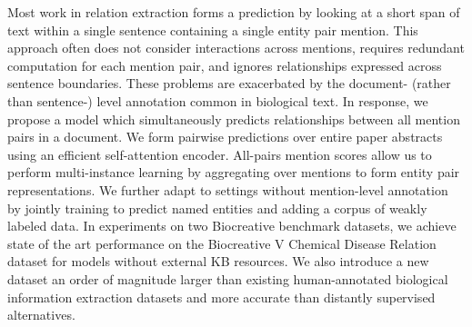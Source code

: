 Most work in relation extraction forms a prediction by looking at a short span of text within a single sentence containing a single entity pair mention. This approach often does not consider interactions across mentions, requires redundant computation for each mention pair, and ignores relationships expressed across sentence boundaries. These problems are exacerbated by the document- (rather than sentence-) level annotation common in biological text. In response, we propose a model which simultaneously predicts relationships between all mention pairs in a document. We form pairwise predictions over entire paper abstracts using an efficient self-attention encoder. All-pairs mention scores allow us to perform multi-instance learning by aggregating over mentions to form entity pair representations. We further adapt to settings without mention-level annotation by jointly training to predict named entities and adding a corpus of weakly labeled data. In experiments on two Biocreative benchmark datasets, we achieve state of the art performance on the Biocreative V Chemical Disease Relation dataset for models without external KB resources. We also introduce a new dataset an order of magnitude larger than existing human-annotated biological information extraction datasets and more accurate than distantly supervised alternatives.
